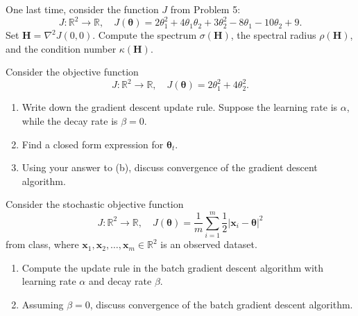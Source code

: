 \documentclass[12pt,reqno]{amsart}
\begin{document}
\vfill
\newpage
\prob One last time, consider the function $J$ from Problem 5:
	\[J: \mathbb{R}^2 \to \mathbb{R}, \quad J(\boldsymbol{\theta}) = 2\theta_1^2 + 4\theta_1\theta_2 + 3\theta_2^2 -8\theta_1 - 10\theta_2 + 9.
	\]
Set $\mathbf{H} = \nabla^2J(0,0)$. Compute the spectrum $\sigma(\mathbf{H})$, the spectral radius $\rho( \mathbf{H})$, and the condition number $\kappa(\mathbf{H})$.









\vfill
\prob Consider the objective function
	\[J:\mathbb{R}^2 \to \mathbb{R}, \quad J(\boldsymbol{\theta}) = 2\theta_1^2 + 4\theta_2^2.
	\]


\begin{enumerate}
\item Write down the gradient descent update rule. Suppose the learning rate is $\alpha$, while the decay rate is $\beta=0$.\vfill
\item Find a closed form expression for $\boldsymbol{\theta}_t$.\vfill
\item Using your answer to (b), discuss convergence of the gradient descent algorithm.
\end{enumerate}









\vfill
\newpage
\prob Consider the stochastic objective function
	\[J:\mathbb{R}^2 \to \mathbb{R}, \quad J(\boldsymbol{\theta}) = \frac{1}{m} \sum_{i=1}^m \frac{1}{2}|\mathbf{x}_i - \boldsymbol{\theta}|^2
	\]
from class, where $\mathbf{x}_1,\mathbf{x}_2, \ldots, \mathbf{x}_m \in \mathbb{R}^2$ is an observed dataset.

\medskip
\begin{enumerate}
\item Compute the update rule in the batch gradient descent algorithm with learning rate $\alpha$ and decay rate $\beta$.\vfill
\item Assuming $\beta=0$, discuss convergence of the batch gradient descent algorithm.\vfill
\end{enumerate}
\end{document}
